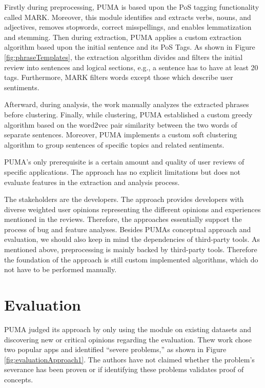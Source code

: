 Firstly during preprocessing, PUMA is based upon the PoS tagging functionality called MARK. Moreover, this module identifies and extracts verbs, nouns, and adjectives, removes stopwords, correct misspellings, and enables lemmatization and stemming. Then during extraction, PUMA applies a custom extraction algorithm based upon the initial sentence and its PoS Tags. As shown in Figure \ref{fig:phraseTemplates}, the extraction algorithm divides and filters the initial review into sentences and logical sections, e.g., a sentence has to have at least 20 tags. Furthermore, MARK filters words except those which describe user sentiments.

Afterward, during analysis, the work manually analyzes the extracted phrases before clustering. Finally, while clustering, PUMA established a custom greedy algorithm based on the word2vec pair similarity between the two words of separate sentences. Moreover, PUMA implements a custom soft clustering algorithm to group sentences of specific topics and related sentiments.

PUMA’s only prerequisite is a certain amount and quality of user reviews of specific applications. The approach has no explicit limitations but does not evaluate features in the extraction and analysis process.

The stakeholders are the developers. The approach provides developers with diverse weighted user opinions representing the different opinions and experiences mentioned in the reviews. Therefore, the approaches essentially support the process of bug and feature analyses.
Besides PUMAs conceptual approach and evaluation, we should also keep in mind the dependencies of third-party tools. As mentioned above, preprocessing is mainly backed by third-party tools. Therefore the foundation of the approach is still custom implemented algorithms, which do not have to be performed manually.


\section{Evaluation}

PUMA judged its approach by only using the module on existing datasets and discovering new or critical opinions regarding the evaluation. Thew work chose two popular apps and identified “severe problems,” as shown in Figure \ref{fig:evaluationApproach1}. The authors have not claimed whether the problem’s severance has been proven or if identifying these problems validates proof of concepts.

